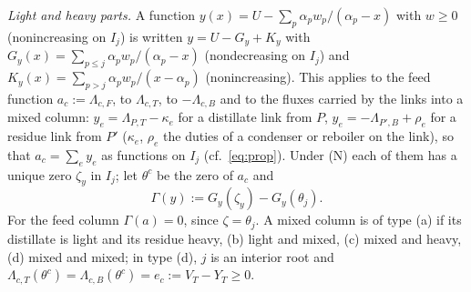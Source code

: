 \documentclass[11pt,a4paper]{report}
\newcommand{\Lam}{\Lambda}
\begin{document}
\emph{Light and heavy parts.} A function $y(x)=U-\sum_p\alpha_pw_p/(\alpha_p-x)$ with $w\ge0$ (nonincreasing on $I_j$) is
written $y=U-G_y+K_y$ with $G_y(x)=\sum_{p\le j}\alpha_pw_p/(\alpha_p-x)$ (nondecreasing on $I_j$) and
$K_y(x)=\sum_{p>j}\alpha_pw_p/(x-\alpha_p)$ (nonincreasing). This applies to the feed function $a_c:=\Lam_{c,F}$, to
$\Lam_{c,T}$, to $-\Lam_{c,B}$ and to the fluxes carried by the links into a mixed column: $y_e=\Lam_{P,T}-\kappa_e$ for a
distillate link from $P$, $y_e=-\Lam_{P',B}+\rho_e$ for a residue link from $P'$ ($\kappa_e$, $\rho_e$ the duties of a
condenser or reboiler on the link), so that $a_c=\sum_ey_e$ as functions on $I_j$ (cf.~\eqref{eq:prop}). Under (N)
each of them has a unique zero $\zeta_y$ in $I_j$; let $\theta^c$ be the zero of $a_c$ and
\[\Gamma(y):=G_y(\zeta_y)-G_y(\theta_j).\]
For the feed column $\Gamma(a)=0$, since $\zeta=\theta_j$. A mixed column is of type (a) if its distillate is light and
its residue heavy, (b) light and mixed, (c) mixed and heavy, (d) mixed and mixed; in type (d), $j$ is an interior root
and $\Lam_{c,T}(\theta^c)=\Lam_{c,B}(\theta^c)=e_c:=V_T-Y_T\ge0$.
\end{document}
